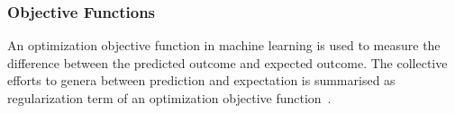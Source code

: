 \subsubsection{Objective Functions}
An optimization objective function in machine learning is used to measure the difference between the predicted outcome and expected outcome. The collective efforts to genera between prediction and expectation is summarised as regularization term of an optimization objective function~\cite{goodfellow_2015}.  